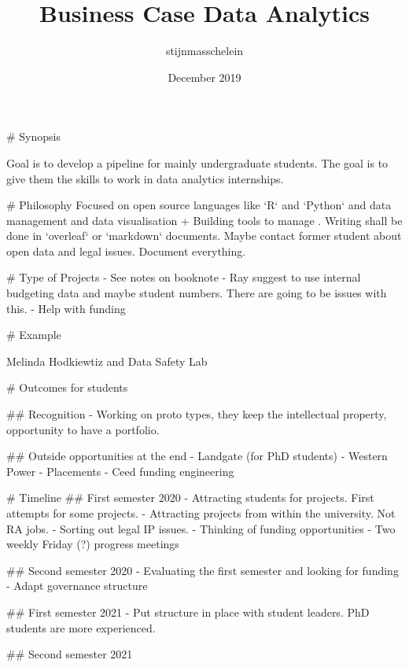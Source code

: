 \documentclass{article}
\title{Business Case Data Analytics}
\author{stijnmasschelein }
\date{December 2019}
\begin{document}
\begin{markdown}
# Synopsis

Goal is to develop a pipeline for mainly undergraduate students. The goal is to give them the skills to work in data analytics internships.

# Philosophy
Focused on open source languages like `R` and `Python` and data management and data visualisation + Building tools to manage . Writing shall be done in `overleaf` or `markdown` documents. Maybe contact former student about open data and legal issues. Document everything.

# Type of Projects
- See notes on booknote
- Ray suggest to use internal budgeting data and maybe student numbers.     There are going to be issues with this. 
- Help with funding

# Example

Melinda Hodkiewtiz and Data Safety Lab

# Outcomes for students

## Recognition
- Working on proto types, they keep the intellectual property, opportunity to have a portfolio.

## Outside opportunities at the end 
- Landgate (for PhD students)
- Western Power
- Placements 
- Ceed funding engineering

# Timeline
## First semester 2020
- Attracting students for projects. First attempts for some projects.
- Attracting projects from within the university. Not RA jobs.
- Sorting out legal IP issues.
- Thinking of funding opportunities
- Two weekly Friday (?) progress meetings

## Second semester 2020
- Evaluating the first semester and looking for funding
- Adapt governance structure

## First semester 2021 
- Put structure in place with student leaders. PhD students are more        experienced. 

## Second semester 2021 

\end{markdown}
\end{document}
